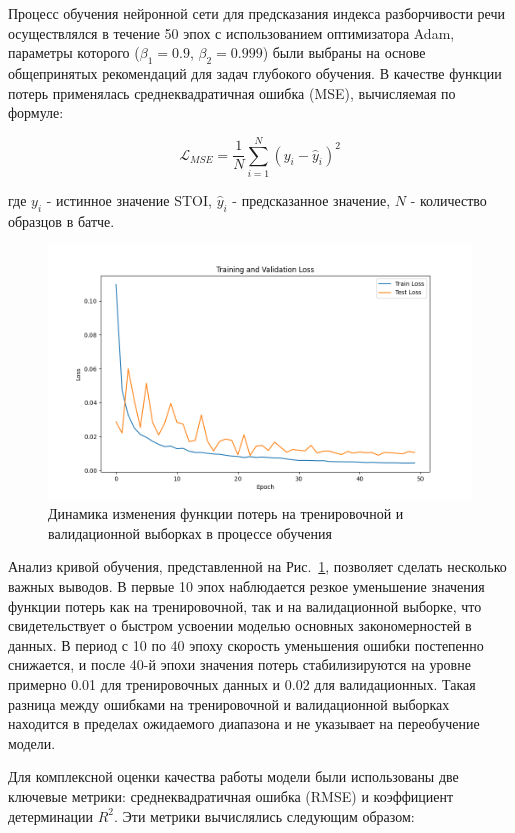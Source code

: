 \documentclass[oneside, final, 14pt]{extarticle}
\begin{document}
Процесс обучения нейронной сети для предсказания индекса разборчивости речи осуществлялся в течение 50 эпох с использованием оптимизатора Adam, параметры которого ($\beta_1=0.9$, $\beta_2=0.999$) были выбраны на основе общепринятых рекомендаций для задач глубокого обучения. В качестве функции потерь применялась среднеквадратичная ошибка (MSE), вычисляемая по формуле:

\begin{equation}
\mathcal{L}_{MSE} = \frac{1}{N}\sum_{i=1}^N(y_i - \hat{y}_i)^2
\end{equation}

где $y_i$ - истинное значение STOI, $\hat{y}_i$ - предсказанное значение, $N$ - количество образцов в батче.

\begin{figure}[]
\centering
\includegraphics[width=0.85\linewidth]{training_curve.png}
\caption{Динамика изменения функции потерь на тренировочной и валидационной выборках в процессе обучения}
\label{fig:training_curve}
\end{figure}

Анализ кривой обучения, представленной на Рис.~\ref{fig:training_curve}, позволяет сделать несколько важных выводов. В первые 10 эпох наблюдается резкое уменьшение значения функции потерь как на тренировочной, так и на валидационной выборке, что свидетельствует о быстром усвоении моделью основных закономерностей в данных. В период с 10 по 40 эпоху скорость уменьшения ошибки постепенно снижается, и после 40-й эпохи значения потерь стабилизируются на уровне примерно 0.01 для тренировочных данных и 0.02 для валидационных. Такая разница между ошибками на тренировочной и валидационной выборках находится в пределах ожидаемого диапазона и не указывает на переобучение модели.

Для комплексной оценки качества работы модели были использованы две ключевые метрики: среднеквадратичная ошибка (RMSE) и коэффициент детерминации $R^2$. Эти метрики вычислялись следующим образом:
\end{document}
